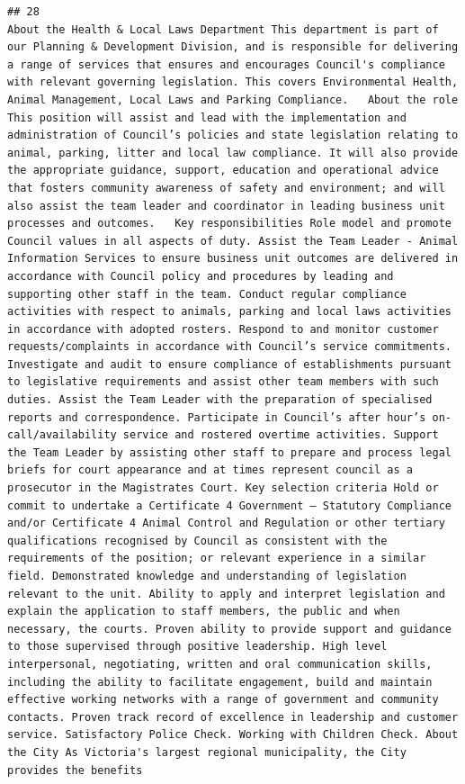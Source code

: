 \documentclass[11pt,a4paper,]{article}
\begin{document}
\begin{verbatim}
## 28                                                                                                                                                                                                                                                                                                                                                                                                                                                               About the Health & Local Laws Department This department is part of our Planning & Development Division, and is responsible for delivering a range of services that ensures and encourages Council's compliance with relevant governing legislation. This covers Environmental Health, Animal Management, Local Laws and Parking Compliance.   About the role This position will assist and lead with the implementation and administration of Council’s policies and state legislation relating to animal, parking, litter and local law compliance. It will also provide the appropriate guidance, support, education and operational advice that fosters community awareness of safety and environment; and will also assist the team leader and coordinator in leading business unit processes and outcomes.   Key responsibilities Role model and promote Council values in all aspects of duty. Assist the Team Leader - Animal Information Services to ensure business unit outcomes are delivered in accordance with Council policy and procedures by leading and supporting other staff in the team. Conduct regular compliance activities with respect to animals, parking and local laws activities in accordance with adopted rosters. Respond to and monitor customer requests/complaints in accordance with Council’s service commitments. Investigate and audit to ensure compliance of establishments pursuant to legislative requirements and assist other team members with such duties. Assist the Team Leader with the preparation of specialised reports and correspondence. Participate in Council’s after hour’s on-call/availability service and rostered overtime activities. Support the Team Leader by assisting other staff to prepare and process legal briefs for court appearance and at times represent council as a prosecutor in the Magistrates Court. Key selection criteria Hold or commit to undertake a Certificate 4 Government – Statutory Compliance and/or Certificate 4 Animal Control and Regulation or other tertiary qualifications recognised by Council as consistent with the requirements of the position; or relevant experience in a similar field. Demonstrated knowledge and understanding of legislation relevant to the unit. Ability to apply and interpret legislation and explain the application to staff members, the public and when necessary, the courts. Proven ability to provide support and guidance to those supervised through positive leadership. High level interpersonal, negotiating, written and oral communication skills, including the ability to facilitate engagement, build and maintain effective working networks with a range of government and community contacts. Proven track record of excellence in leadership and customer service. Satisfactory Police Check. Working with Children Check. About the City As Victoria's largest regional municipality, the City provides the benefits 
\end{verbatim}
\end{document}

